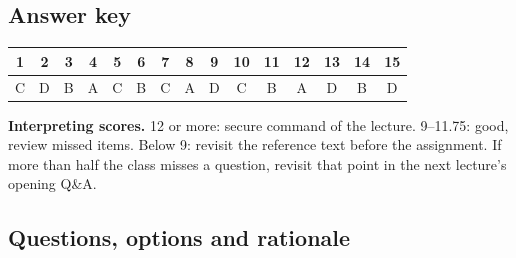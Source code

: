 \documentclass[11pt]{article}
\begin{document}
\subsection*{Answer key}\begin{center}\small\renewcommand{\arraystretch}{1.3}\begin{tabular}{|c|c|c|c|c|c|c|c|c|c|c|c|c|c|c|}\hline \textbf{1} & \textbf{2} & \textbf{3} & \textbf{4} & \textbf{5} & \textbf{6} & \textbf{7} & \textbf{8} & \textbf{9} & \textbf{10} & \textbf{11} & \textbf{12} & \textbf{13} & \textbf{14} & \textbf{15}\\\hline C & D & B & A & C & B & C & A & D & C & B & A & D & B & D\\\hline\end{tabular}\end{center}

\textbf{Interpreting scores.} 12 or more: secure command of the lecture. 9--11.75: good, review missed items. Below 9: revisit the reference text before the assignment. If more than half the class misses a question, revisit that point in the next lecture's opening Q\&A.

\subsection*{Questions, options and rationale}
\end{document}
